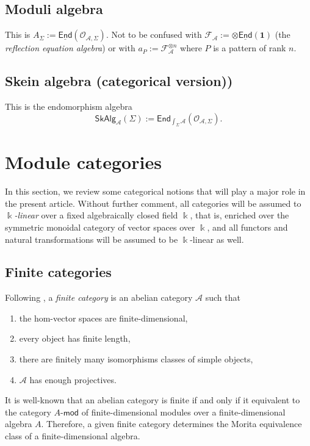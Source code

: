\documentclass[11pt]{article}
\newcommand{\cA}{\mathcal{A}}
\theoremstyle{definition}
\begin{document}
\subsection{Moduli algebra}


This is $A_\Sigma := \underline{\mathsf{End}}(\mathcal{O}_{\mathcal{A}, \Sigma})$. Not to be confused with $\mathcal{F}_{\mathcal{A}} := \otimes\underline{\mathsf{End}}(\mathbf{1})$ (the \textit{reflection equation algebra}) or with $a_P := \mathcal{F}_{\mathcal{A}} ^{\otimes n}$ where $P$ is a pattern of rank $n$.


\subsection{Skein algebra (categorical version))}

This is the endomorphism algebra $$  \mathsf{SkAlg}_\cA (\Sigma):= \mathsf{End}_{\int_{\Sigma} \cA} (\mathcal{O}_{\mathcal{A}, \Sigma}). $$







	
\section{Module categories}


In this section, we review some categorical notions that will play a major role in the present article. Without further comment, all categories  will be assumed to \emph{$\Bbbk$-linear} over a fixed algebraically closed  field $\Bbbk$, that is, enriched over the symmetric monoidal category  of vector spaces over $\Bbbk$, and all functors and natural transformations will be assumed to be $\Bbbk$-linear as well.


\subsection{Finite categories}

Following \cite{etingofostrik}, a \emph{finite category} is an abelian category $\mathcal{A}$ such that
\begin{enumerate}[label=(\roman*)]\itemsep0em 
  \item the hom-vector spaces are finite-dimensional,
  \item every object has finite length,
  \item there are finitely many isomorphisms classes of simple objects,
  \item $\mathcal{A}$ has enough projectives.
\end{enumerate}
It is well-known that an abelian category is finite if and only if it equivalent to the category $A$-$\mathsf{mod}$ of finite-dimensional modules over a finite-dimensional algebra $A$. Therefore, a given finite category determines the Morita equivalence class of a finite-dimensional algebra.
\end{document}
